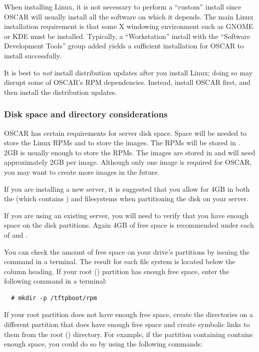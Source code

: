 When installing Linux, it is not necessary to perform a ``custom''
install since OSCAR will usually install all the software on which it
depends.  The main Linux installation requirement is that some X
windowing environment such as GNOME or KDE must be installed.
Typically, a ``Workstation'' install with the ``Software Development
Tools'' group added yields a sufficient installation for OSCAR to
install successfully.

It is best to {\em not} install distribution updates after you install
Linux; doing so may disrupt some of OSCAR's RPM dependencies.
Instead, install OSCAR first, and then install the distribution
updates.


\subsubsection{Disk space and directory considerations}
\label{det:serverdiskpar}

OSCAR has certain requirements for server disk space. Space will be
needed to store the Linux RPMs and to store the images.  The RPMs will
be stored in .  2GB is usually enough to store the
RPMs.  The images are stored in  and will
need approximately 2GB per image.  Although only one image is required
for OSCAR, you may want to create more images in the future.

If you are installing a new server, it is suggested that you allow for
4GB in both the \file{/} (which contains ) and
 filesystems when partitioning the disk on your server.

If you are using an existing server, you will need to verify that you
have enough space on the disk partitions.  Again 4GB of free space is
recommended under each of \file{/} and .

You can check the amount of free space on your drive's partitions by
issuing the command  in a terminal.  The result for each
file system is located below the  column heading. If
your root (\file{/}) partition has enough free space, enter the
following command in a terminal:

\begin{verbatim}
  # mkdir -p /tftpboot/rpm
\end{verbatim}
  
If your root partition does not have enough free space, create the
directories on a different partition that does have enough free space
and create symbolic links to them from the root (\file{/}) directory.
For example, if the partition containing  contains enough
space, you could do so by using the following commands:

